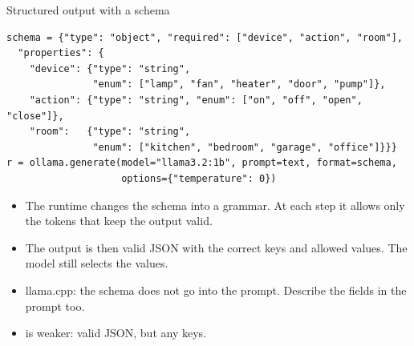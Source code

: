 \begin{frame}[fragile]{Structured output with a schema}
\begin{lstlisting}
schema = {"type": "object", "required": ["device", "action", "room"],
  "properties": {
    "device": {"type": "string",
               "enum": ["lamp", "fan", "heater", "door", "pump"]},
    "action": {"type": "string", "enum": ["on", "off", "open", "close"]},
    "room":   {"type": "string",
               "enum": ["kitchen", "bedroom", "garage", "office"]}}}
r = ollama.generate(model="llama3.2:1b", prompt=text, format=schema,
                    options={"temperature": 0})
\end{lstlisting}
  \small
  \begin{itemize}
    \item The runtime changes the schema into a grammar. At each step it
          allows only the tokens that keep the output valid.
    \item The output is then valid JSON with the correct keys and allowed
          values. The model still selects the values.
    \item llama.cpp: the schema does not go into the prompt. Describe the
          fields in the prompt too.
    \item {} is weaker: valid JSON, but any keys.
  \end{itemize}
\end{frame}


